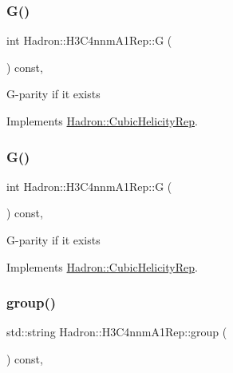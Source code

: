 \subsubsection{\texorpdfstring{G()}{G()}\hspace{0.1cm}{\footnotesize\ttfamily [1/2]}}
{\footnotesize\ttfamily int Hadron\+::\+H3\+C4nnm\+A1\+Rep\+::G (\begin{DoxyParamCaption}{ }\end{DoxyParamCaption}) const\hspace{0.3cm}{\ttfamily [inline]}, {\ttfamily [virtual]}}

G-\/parity if it exists 

Implements \mbox{\hyperlink{structHadron_1_1CubicHelicityRep_a50689f42be1e6170aa8cf6ad0597018b}{Hadron\+::\+Cubic\+Helicity\+Rep}}.

\mbox{\label{structHadron_1_1H3C4nnmA1Rep_a425b1fd7918738b76eacdc41283d587f}} 
\subsubsection{\texorpdfstring{G()}{G()}\hspace{0.1cm}{\footnotesize\ttfamily [2/2]}}
{\footnotesize\ttfamily int Hadron\+::\+H3\+C4nnm\+A1\+Rep\+::G (\begin{DoxyParamCaption}{ }\end{DoxyParamCaption}) const\hspace{0.3cm}{\ttfamily [inline]}, {\ttfamily [virtual]}}

G-\/parity if it exists 

Implements \mbox{\hyperlink{structHadron_1_1CubicHelicityRep_a50689f42be1e6170aa8cf6ad0597018b}{Hadron\+::\+Cubic\+Helicity\+Rep}}.

\mbox{\label{structHadron_1_1H3C4nnmA1Rep_a90bcfd4f15d29f444a79b1dcd8198ea5}} 
\subsubsection{\texorpdfstring{group()}{group()}\hspace{0.1cm}{\footnotesize\ttfamily [1/3]}}
{\footnotesize\ttfamily std\+::string Hadron\+::\+H3\+C4nnm\+A1\+Rep\+::group (\begin{DoxyParamCaption}{ }\end{DoxyParamCaption}) const\hspace{0.3cm}{\ttfamily [inline]}, {\ttfamily [virtual]}}

